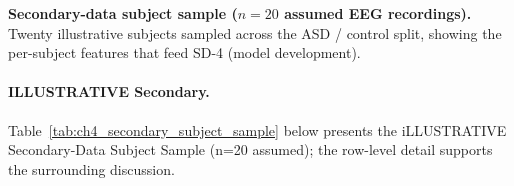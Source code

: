 \noindent\textbf{Secondary-data subject sample ($n{=}20$ assumed EEG recordings).} Twenty illustrative subjects sampled across the ASD / control split, showing the per-subject features that feed SD-4 (model development).

\noindent{}\vspace{4pt}

\paragraph{ILLUSTRATIVE Secondary.}
\noindent Table~\ref{tab:ch4_secondary_subject_sample} below presents the iLLUSTRATIVE Secondary-Data Subject Sample (n=20 assumed); the row-level detail supports the surrounding discussion.



